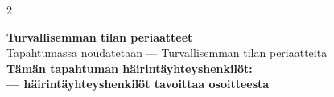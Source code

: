 \documentclass[12pt]{article} %
\begin{document}
\begin{multicols}{2}
    \derivaattanollanarvoinen

    \muinaistenvalssi

    \mandariinimies
    \mandariinihunningolla
    
    \volga
    
    \miesulossinusta
    
    \vanhustenpoyta
    \amorinfinitus
    \onomato
    
    \toppila
    \oulumaa
    \oululainenbaarikierros
    \kukakakkaaaltaaseen
    \kaijonvalot
    \ukkometso

    \sitsipoytahajotettu
    
    \vitutuslaulu
    \viskadrickahelanatten
    

    \yollataas
    \siljalinespecial
    \piilossaviinat 
    \exculaulu
    \sornaigusha
    \annannen

    \henkilokunta 
    \fuksilaulu

    

\end{multicols}

\clearpage
\begin{center}
    

\vspace{1cm}
\textbf{Turvallisemman tilan periaatteet}\\
Tapahtumassa noudatetaan --- Turvallisemman tilan periaatteita\\

\vspace{1.0cm}
\textbf{Tämän tapahtuman häirintäyhteyshenkilöt:}\\

\vspace{1cm}
\textbf{--- häirintäyhteyshenkilöt tavoittaa osoitteesta}\\

\end{center}
\end{document}
